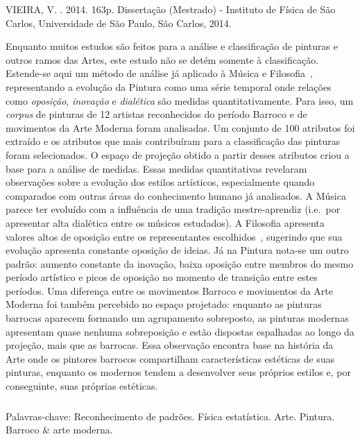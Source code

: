 \begin{resumo2}
\vspace{-10mm}
VIEIRA, V. \textbf{\ABNTtitulodata}. 2014. 163p. Dissertação (Mestrado) - Instituto de Física de São Carlos, Universidade de São Paulo, São Carlos, 2014.
\vspace{15mm}

Enquanto muitos estudos são feitos para a análise e classificação de
pinturas e outros ramos das Artes, este estudo não se detém somente à
classificação. Estende-se aqui um método de análise já aplicado à
Música e Filosofia~\cite{vieira}, representando a evolução da Pintura
como uma série temporal onde relações como \textit{oposição},
\textit{inovação} e \textit{dialética} são medidas
quantitativamente. Para isso, um \textit{corpus} de pinturas de 12
artistas reconhecidos do período Barroco e de movimentos da Arte
Moderna foram analisadas. Um conjunto de 100 atributos foi extraído e
os atributos que mais contribuíram para a classificação das pinturas
foram selecionados. O espaço de projeção obtido a partir desses
atributos criou a base para a análise de medidas. Essas medidas
quantitativas revelaram observações sobre a evolução dos estilos
artísticos, especialmente quando comparados com outras áreas do
conhecimento humano já analisados. A Música parece ter evoluído com a
influência de uma tradição mestre-aprendiz (i.e.\ por apresentar alta
dialética entre os músicos estudados). A Filosofia apresenta valores
altos de oposição entre os representantes escolhidos~\cite{vieira},
sugerindo que sua evolução apresenta constante oposição de ideias. Já
na Pintura nota-se um outro padrão: aumento constante da inovação,
baixa oposição entre membros do mesmo período artístico e picos de
oposição no momento de transição entre estes períodos. Uma diferença
entre os movimentos Barroco e movimentos da Arte Moderna foi também
percebido no espaço projetado: enquanto as pinturas barrocas aparecem
formando um agrupamento sobreposto, as pinturas modernas apresentam
quase nenhuma sobreposição e estão dispostas espalhadas ao longo da
projeção, mais que as barrocas. Essa observação encontra base na
história da Arte onde os pintores barrocos compartilham
características estéticas de suas pinturas, enquanto os modernos
tendem a desenvolver seus próprios estilos e, por conseguinte, suas
próprias estéticas.

$\phantom{linha em branco}$\\ Palavras-chave: Reconhecimento de
padrões. Física estatística. Arte. Pintura. Barroco \& arte
moderna. 

\end{resumo2}



